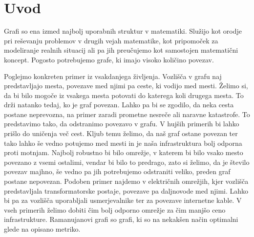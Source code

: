 \section{Uvod}
Grafi so ena izmed najbolj uporabnih struktur v matematiki. Služijo kot orodje pri reševanju problemov v drugih vejah matematike, kot pripomoček za modeliranje realnih situacij ali pa jih preučujemo kot samostojen matematični koncept. Pogosto potrebujemo grafe, ki imajo visoko količino povezav.

Poglejmo konkreten primer iz vsakdanjega življenja. Vozlišča v grafu naj predstavljajo mesta, povezave med njimi pa ceste, ki vodijo med mesti. Želimo si, da bi bilo mogoče iz vsakega mesta potovati do katerega koli drugega mesta. To drži natanko tedaj, ko je graf povezan. Lahko pa bi se zgodilo, da neka cesta postane neprevozna, na primer zaradi prometne nesreče ali naravne katastrofe. To predstavimo tako, da odstranimo povezavo v grafu. V hujših primerih bi lahko prišlo do uničenja več cest. Kljub temu želimo, da naš graf ostane povezan ter tako lahko še vedno potujemo med mesti in je naša infrastruktura bolj odporna proti motnjam. Najbolj robustno bi bilo omrežje, v katerem bi bilo vsako mesto povezano z vsemi ostalimi, vendar bi bilo to predrago, zato si želimo, da je število povezav majhno, še vedno pa jih potrebujemo odstraniti veliko, preden graf postane nepovezan.
Podoben primer najdemo v električnih omrežjih, kjer vozlišča predstavljala transformatorske postaje, povezave pa daljnovode med njimi. Lahko bi pa za vozlišča uporabljali usmerjevalnike ter za povezave internetne kable. V vseh primerih želimo dobiti čim bolj odporno omrežje za čim manjšo ceno infrastrukture. Ramanujanovi grafi so grafi, ki so na nekakšen način optimalni glede na opisano metriko.
